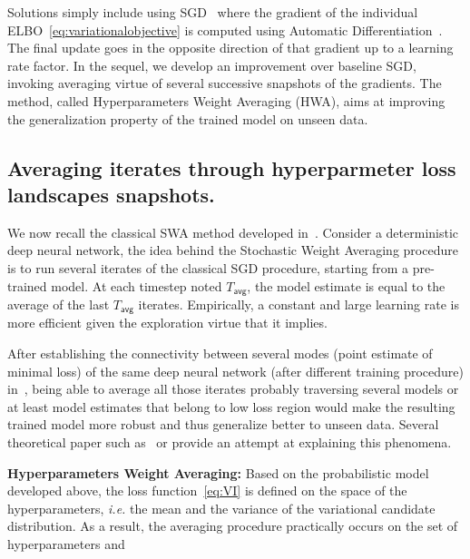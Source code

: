 \documentclass{article} %
\begin{document}
Solutions simply include using SGD~\citep{bottou2008tradeoffs} where the gradient of the individual ELBO~\eqref{eq:variationalobjective} is computed using Automatic Differentiation~\citep{kucukelbir2017automatic}. The final update goes in the opposite direction of that gradient up to a learning rate factor.
In the sequel, we develop an improvement over baseline SGD, invoking averaging virtue of several successive snapshots of the gradients.
The method, called Hyperparameters Weight Averaging (HWA), aims at improving the generalization property of the trained model on unseen data.


\subsection{Averaging iterates through hyperparmeter loss landscapes snapshots.}

We now recall the classical SWA method developed in~\citep{izmailov2018averaging}. 
Consider a deterministic deep neural network, the idea behind the Stochastic Weight Averaging procedure is to run several iterates of the classical SGD procedure, starting from a pre-trained model.
At each timestep noted $T_{\mathsf{avg}}$, the model estimate is equal to the average of the last $T_{\mathsf{avg}}$ iterates.
Empirically, a constant and large learning rate is more efficient given the exploration virtue that it implies.

After establishing the connectivity between several modes (point estimate of minimal loss) of the same deep neural network (after different training procedure) in~\citep{garipov2018loss}, being able to average all those iterates probably traversing several models or at least model estimates that belong to low loss region would make the resulting trained model more robust and thus generalize better to unseen data.
Several theoretical paper such as~\citep{he2019asymmetric} or \citep{keskar2016large} provide an attempt at explaining this phenomena.


\textbf{Hyperparameters Weight Averaging:}
Based on the probabilistic model developed above, the loss function~\eqref{eq:VI} is defined on the space of the hyperparameters, \textit{i.e.} the mean and the variance of the variational candidate distribution.
As a result, the averaging procedure practically occurs on the set of hyperparameters and 
\end{document}
